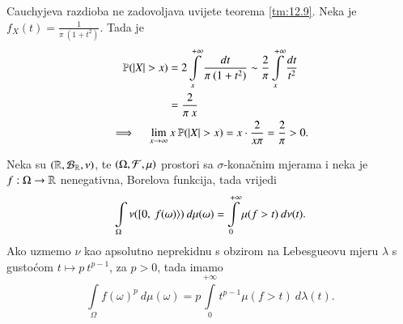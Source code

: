 \begin{pr}  \label{pr:12.11}
    Cauchyjeva razdioba ne zadovoljava uvijete teorema \ref{tm:12.9}.
    Neka je $f_X (t) = \frac{1}{\pi \: (1 + t^2)}$.
    Tada je
    \begin{equation*}
        \begin{gathered}
            \begin{aligned}
                \mathbb{P}({|X| > x}) &= 2 \int\limits_x^{+\infty} \frac{dt}{\pi \: (1 + t^2)} \sim \frac{2}{\pi} \int\limits_x^{+\infty} \frac{dt}{t^2}\\
                &= \frac{2}{\pi \: x}
            \end{aligned}\\
            \implies \quad \lim\limits_{x \to \infty} x \: \mathbb{P}({|X| > x}) = x \cdot \frac{2}{x \pi} = \frac{2}{\pi} > 0.
        \end{gathered}
    \end{equation*}
\end{pr}

\begin{tm}  \label{tm:12.11-1}
    Neka su $(\mathbb{R}, \mathcal{B}_{\mathbb{R}}, \nu)$, te $ (\Omega, \mathcal{F}, \mu) $ prostori sa $\sigma$-kona\v cnim mjerama i neka je $f : \Omega \to \mathbb{R}$ nenegativna, Borelova funkcija, tada vrijedi
    \begin{equation*}
        \int\limits_\Omega \nu ([ {0}, \: {f(\omega)} \rangle) \: d \mu (\omega) = \int\limits_{0}^{+\infty} \mu (f>t) \: d \nu (t).
    \end{equation*}
    Ako uzmemo $\nu$ kao apsolutno neprekidnu s obzirom na Lebesgueovu mjeru $\lambda$ s gusto\' com $t \mapsto p \: t^{p-1}$, za $p>0$, tada imamo
    \begin{equation*}
        \int\limits_\Omega f(\omega)^p \: d \mu (\omega) = p \int\limits_{0}^{+\infty} t^{p-1} \mu (f > t) \: d \lambda (t).
    \end{equation*}
\end{tm}

